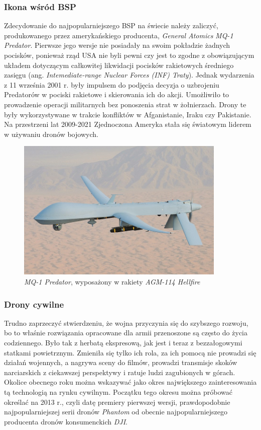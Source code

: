 \subsubsection{Ikona wśród BSP}
Zdecydowanie do najpopularniejszego BSP na świecie należy zaliczyć, produkowanego przez amerykańskiego producenta, \textit{General Atomics} \textit{MQ-1 Predator}. Pierwsze jego wersje nie posiadały na swoim pokładzie żadnych pocisków, ponieważ rząd USA nie byli pewni czy jest to zgodne z obowiązującym układem dotyczącym całkowitej likwidacji pocisków rakietowych średniego zasięgu (ang. \textit{Intemediate-range Nuclear Forces (INF) Traty}). Jednak wydarzenia z 11 września 2001 r. były impulsem do podjęcia decyzja o uzbrojeniu Predatorów w pociski rakietowe i skierowania ich do akcji. Umożliwiło to prowadzenie operacji militarnych bez ponoszenia strat w żołnierzach. Drony te były wykorzystywane w trakcie konfliktów w Afganistanie, Iraku czy Pakistanie. Na przestrzeni lat 2009-2021 Zjednoczona Ameryka stała się światowym liderem w używaniu dronów bojowych.\cite{dron-ibuk}\cite{predator-wiki} 


\begin{figure}[!ht]
\begin{center}
  \includegraphics[width=10cm]{./Obrazy/predator.jpg}
  \caption{\textit{MQ-1 Predator}, wyposażony w rakiety \textit{AGM-114 Hellfire}}
\end{center}
\end{figure}

\subsubsection{Drony cywilne}
Trudno zaprzeczyć stwierdzeniu, że wojna przyczynia się do szybszego rozwoju, bo to właśnie rozwiązania opracowane dla armii przenoszone są często do życia codziennego. Było tak z herbatą ekspresową, jak jest i teraz z bezzałogowymi statkami powietrznym. Zmieniła się tylko ich rola, za ich pomocą nie prowadzi się działań wojennych, a nagrywa sceny do filmów, prowadzi transmisje skoków narciarskich z ciekawszej perspektywy i ratuje ludzi zagubionych w górach. Okolice obecnego roku można wskazywać jako okres największego zainteresowania tą technologią na rynku cywilnym. Początku tego okresu można próbować określać na 2013 r., czyli datę premiery pierwszej wersji, prawdopodobnie najpopularniejszej serii dronów \textit{Phantom} od obecnie najpopularniejszego producenta dronów konsumenckich \textit{DJI}.


